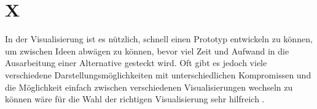 \section{X} 
\label{chap:X}
In der Visualisierung ist es nützlich, schnell einen Prototyp entwickeln zu können, um zwischen Ideen abwägen zu können, bevor viel Zeit und Aufwand in die Ausarbeitung einer Alternative gesteckt wird. 
Oft gibt es jedoch viele verschiedene Darstellungsmöglichkeiten mit unterschiedlichen Kompromissen und die Möglichkeit einfach zwischen verschiedenen Visualisierungen wechseln zu können wäre für die Wahl der richtigen Visualisierung sehr hilfreich \cite{InstituteofElectricalandElectronicsEngineers.2024}.

 
